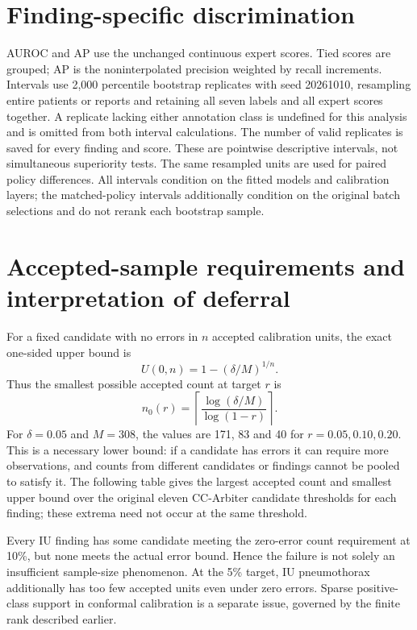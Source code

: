 \documentclass[10pt,a4paper]{article}
\begin{document}
\clearpage
\section{Finding-specific discrimination}
AUROC and AP use the unchanged continuous expert scores. Tied scores are grouped; AP is the noninterpolated precision weighted by recall increments. Intervals use 2,000 percentile bootstrap replicates with seed 20261010, resampling entire patients or reports and retaining all seven labels and all expert scores together. A replicate lacking either annotation class is undefined for this analysis and is omitted from both interval calculations. The number of valid replicates is saved for every finding and score. These are pointwise descriptive intervals, not simultaneous superiority tests. The same resampled units are used for paired policy differences. All intervals condition on the fitted models and calibration layers; the matched-policy intervals additionally condition on the original batch selections and do not rerank each bootstrap sample.


\section{Accepted-sample requirements and interpretation of deferral}
For a fixed candidate with no errors in $n$ accepted calibration units, the exact one-sided upper bound is
\[
 U(0,n)=1-(\delta/M)^{1/n}.
\]
Thus the smallest possible accepted count at target $r$ is
\[
 n_{0}(r)=\left\lceil\frac{\log(\delta/M)}{\log(1-r)}\right\rceil.
\]
For $\delta=0.05$ and $M=308$, the values are 171, 83 and 40 for $r=0.05,0.10,0.20$. This is a necessary lower bound: if a candidate has errors it can require more observations, and counts from different candidates or findings cannot be pooled to satisfy it. The following table gives the largest accepted count and smallest upper bound over the original eleven CC-Arbiter candidate thresholds for each finding; these extrema need not occur at the same threshold.

\noindent Every IU finding has some candidate meeting the zero-error count requirement at 10\%, but none meets the actual error bound. Hence the failure is not solely an insufficient sample-size phenomenon. At the 5\% target, IU pneumothorax additionally has too few accepted units even under zero errors. Sparse positive-class support in conformal calibration is a separate issue, governed by the finite rank described earlier.
\end{document}
